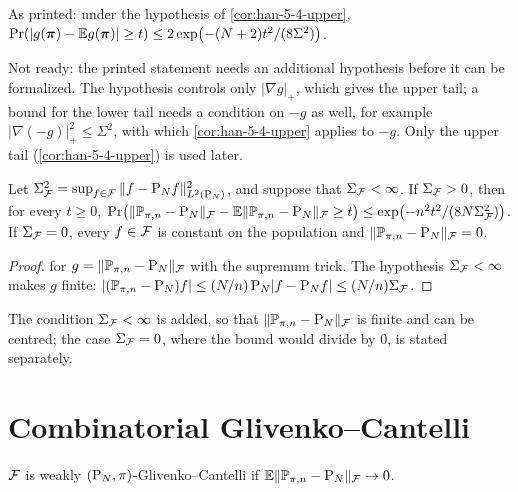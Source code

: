 \begin{corollary}
  \label{cor:han-5-4-two-sided}
  \notready
  As printed: under the hypothesis of \cref{cor:han-5-4-upper}, $\Pr(|g(\boldsymbol\pi)-\mathbb{E} g(\boldsymbol\pi)|\ge t)\le2\exp\bigl(-(N+2)t^2/(8\Sigma^2)\bigr)$.
\end{corollary}
\begin{remark}
  Not ready: the printed statement needs an additional hypothesis before it can be formalized. The hypothesis controls only $|\nabla g|_+$, which gives the upper tail; a bound for the lower tail needs a condition on $-g$ as well, for example $|\nabla(-g)|_+^2\le\Sigma^2$, with which \cref{cor:han-5-4-upper} applies to $-g$. Only the upper tail (\cref{cor:han-5-4-upper}) is used later.
\end{remark}

\begin{theorem}
  \label{thm:han-5-6}
  Let $\Sigma_{\mathcal{F}}^2=\sup_{f\in\mathcal{F}}\|f-\mathrm{P}_N f\|_{L^2(\mathrm{P}_N)}^2$, and suppose that $\Sigma_{\mathcal{F}}<\infty$. If $\Sigma_{\mathcal{F}}>0$, then for every $t\ge0$,
  $\Pr\bigl(\|\mathbb{P}_{\pi,n}-\mathrm{P}_N\|_{\mathcal{F}}-\mathbb{E}\|\mathbb{P}_{\pi,n}-\mathrm{P}_N\|_{\mathcal{F}}\ge t\bigr)\le\exp\bigl(-n^2t^2/(8N\Sigma_{\mathcal{F}}^2)\bigr)$. If $\Sigma_{\mathcal{F}}=0$, every $f\in\mathcal{F}$ is constant on the population and $\|\mathbb{P}_{\pi,n}-\mathrm{P}_N\|_{\mathcal{F}}=0$.
\end{theorem}
\begin{proof}
   for $g=\|\mathbb{P}_{\pi,n}-\mathrm{P}_N\|_{\mathcal{F}}$ with the supremum trick. The hypothesis $\Sigma_{\mathcal{F}}<\infty$ makes $g$ finite: $|(\mathbb{P}_{\pi,n}-\mathrm{P}_N)f|\le(N/n)\,\mathrm{P}_N|f-\mathrm{P}_N f|\le(N/n)\Sigma_{\mathcal{F}}$.
\end{proof}
\begin{remark}
  The condition $\Sigma_{\mathcal{F}}<\infty$ is added, so that $\|\mathbb{P}_{\pi,n}-\mathrm{P}_N\|_{\mathcal{F}}$ is finite and can be centred; the case $\Sigma_{\mathcal{F}}=0$, where the bound would divide by $0$, is stated separately.
\end{remark}

\section{Combinatorial Glivenko--Cantelli}

\begin{definition}
  \label{def:han-5-3-weak}
  $\mathcal{F}$ is weakly $(\mathrm{P}_N,\pi)$-Glivenko--Cantelli if $\mathbb{E}\|\mathbb{P}_{\pi,n}-\mathrm{P}_N\|_{\mathcal{F}}\to0$.
\end{definition}

